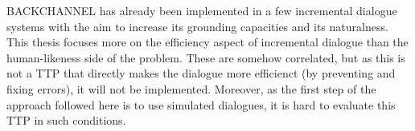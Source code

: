           BACKCHANNEL has already been implemented in a few incremental dialogue systems with the aim to increase its grounding capacities and its naturalness. This thesis focuses more on the efficiency aspect of incremental dialogue than the human-likeness side of the problem. These are somehow correlated, but as this is not a TTP that directly makes the dialogue more efficienct (by preventing and fixing errors), it will not be implemented. Moreover, as the first step of the approach followed here is to use simulated dialogues, it is hard to evaluate this TTP in such conditions.
